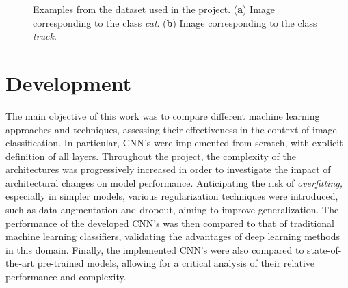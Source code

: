 \documentclass[journal,article,submit,pdftex,moreauthors]{Definitions/mdpi}
\begin{document}
\begin{figure}[H]
\centering
{}%
\hspace{0.2cm}
%
\caption{Examples from the dataset used in the project. (\textbf{a}) Image corresponding to the class \textit{cat}. (\textbf{b}) Image corresponding to the class \textit{truck}.\label{fig:exemplo_imagem_dataset}}
\end{figure}

\section{Development}

The main objective of this work was to compare different machine learning approaches and techniques, assessing their effectiveness in the context of image classification. In particular, CNN's were implemented from scratch, with explicit definition of all layers. Throughout the project, the complexity of the architectures was progressively increased in order to investigate the impact of architectural changes on model performance. Anticipating the risk of \textit{overfitting,} especially in simpler models, various regularization techniques were introduced, such as data augmentation and dropout, aiming to improve generalization. The performance of the developed CNN's was then compared to that of traditional machine learning classifiers, validating the advantages of deep learning methods in this domain. Finally, the implemented CNN's were also compared to state-of-the-art pre-trained models, allowing for a critical analysis of their relative performance and complexity.
\end{document}
